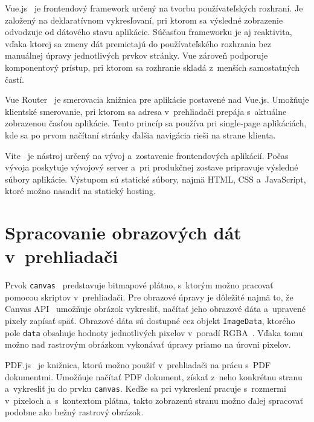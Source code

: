 Vue.js~\cite{vuejs} je frontendový framework určený na tvorbu používateľských rozhraní. Je založený na deklaratívnom vykresľovaní, pri ktorom sa výsledné zobrazenie odvodzuje od dátového stavu aplikácie. Súčasťou frameworku je aj reaktivita, vďaka ktorej sa zmeny dát premietajú do používateľského rozhrania bez manuálnej úpravy jednotlivých prvkov stránky. Vue zároveň podporuje komponentový prístup, pri ktorom sa rozhranie skladá z~menších samostatných častí.

Vue Router~\cite{vuerouter} je smerovacia knižnica pre aplikácie postavené nad Vue.js. Umožňuje klientské smerovanie, pri ktorom sa adresa v~prehliadači prepája s~aktuálne zobrazenou časťou aplikácie. Tento princíp sa používa pri single-page aplikáciách, kde sa po prvom načítaní stránky ďalšia navigácia rieši na strane klienta.

Vite~\cite{vite} je nástroj určený na vývoj a~zostavenie frontendových aplikácií. Počas vývoja poskytuje vývojový server a~pri produkčnej zostave pripravuje výsledné súbory aplikácie. Výstupom sú statické súbory, najmä HTML, CSS a~JavaScript, ktoré možno nasadiť na statický hosting.

\section{Spracovanie obrazových dát v~prehliadači}
\label{sec:browser_image_processing}

Prvok \texttt{canvas}~\cite{whatwgcanvas} predstavuje bitmapové plátno, s~ktorým možno pracovať pomocou skriptov v~prehliadači. Pre obrazové úpravy je dôležité najmä to, že Canvas API~\cite{mdncanvas} umožňuje obrázok vykresliť, načítať jeho obrazové dáta a~upravené pixely zapísať späť. Obrazové dáta sú dostupné cez objekt \texttt{ImageData}, ktorého pole \texttt{data} obsahuje hodnoty jednotlivých pixelov v~poradí RGBA~\cite{mdnimagedata}. Vďaka tomu možno nad rastrovým obrázkom vykonávať úpravy priamo na úrovni pixelov.

PDF.js~\cite{pdfjsexamples} je knižnica, ktorú možno použiť v~prehliadači na prácu s~PDF dokumentmi. Umožňuje načítať PDF dokument, získať z~neho konkrétnu stranu a~vykresliť ju do prvku \texttt{canvas}. Keďže sa pri vykreslení pracuje s~rozmermi v~pixeloch a~s~kontextom plátna, takto zobrazenú stranu možno ďalej spracovať podobne ako bežný rastrový obrázok.

